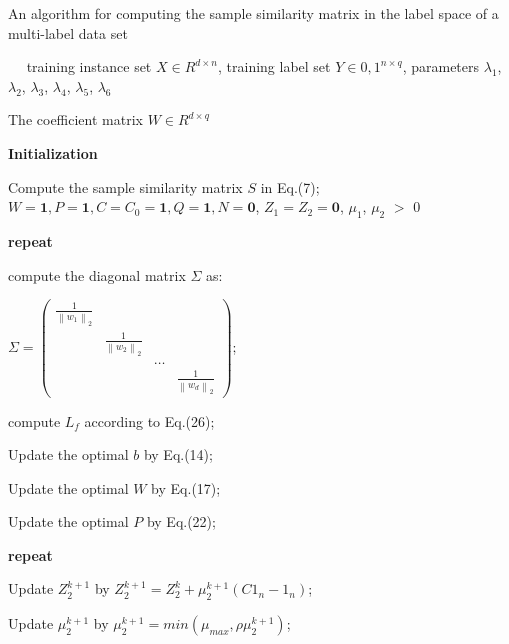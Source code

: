 \documentclass[final,3p,times]{elsarticle}
\begin{document}
\begin{algorithm}[htp]        

\caption{An algorithm for computing the sample similarity matrix in the label space of a multi-label data set}            

\label{alg:Framwork}                  

\begin{algorithmic}[1]                

\REQUIRE ~~                         
    training instance set  $X \in R^{d \times n}$,  
    training label set  $Y \in {0,1}^{n \times q}$, 
    parameters $\lambda_{1}$, $\lambda_{2}$, $\lambda_{3}$, $\lambda_{4}$, $\lambda_{5}$, $\lambda_{6}$



\ENSURE                           
   The coefficient matrix $W \in R^{d \times q}$

\STATE \textbf{Initialization}

\STATE  Compute the sample similarity  matrix $S$ in Eq.(7);$W=\textbf{1}, P=\textbf{1},C=C_0=\textbf{1}, Q=\textbf{1}, N=\textbf{0}$, $Z_1=Z_2=\textbf{0}$, $\mu_{1}$, $\mu_{2}$ $>$ $0$

\STATE \textbf{repeat}

\STATE compute the diagonal matrix $\Sigma$ as:\\

\begin{center}
$
\Sigma=\left(\begin{array}{cccc}
	\frac{1}{\left\|w_{1}\right\|_{2}} & & & \\
	& \frac{1}{\left\|w_{2}\right\|_{2}} & & \\
	& & \ldots & \\
	& & & \frac{1}{\left\|w_{d}\right\|_{2}}
\end{array}\right)
$;
\end{center}


\STATE compute $L_f$ according to Eq.(26);

\STATE Update the optimal $b$  by Eq.(14);

\STATE Update the optimal $W$  by Eq.(17);

\STATE Update the optimal $P$  by Eq.(22);

\STATE \qquad\textbf{repeat}

\STATE \qquad\quad Update $ Z_2^{k+1}$ by $ Z_2^{k+1}=Z_2^{k}+\mu_{2}^{k+1}(C1_n-1_n)$;

\STATE \qquad\quad Update $ \mu_2^{k+1}$ by $ \mu_2^{k+1}=min(\mu_{max},\rho\mu_{2}^{k+1})$;


\end{algorithmic}
\end{algorithm}
\end{document}
